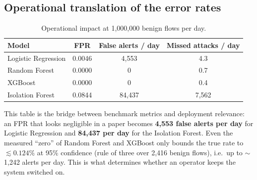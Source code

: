 \documentclass[11pt]{article}
\begin{document}
\subsection*{Operational translation of the error rates}
\begin{table}[h]
\centering
\caption{Operational impact at 1{,}000{,}000 benign flows per day.}
\label{tab:ops}
\begin{tabular}{@{} l c c c @{}}
\toprule
\textbf{Model} & \textbf{FPR} & \textbf{False alerts / day} & \textbf{Missed attacks / day} \\
\midrule
Logistic Regression & 0.0046 & 4{,}553 & 4.3 \\
Random Forest       & 0.0000 & 0 & 0.7 \\
XGBoost             & 0.0000 & 0 & 0.4 \\
Isolation Forest    & 0.0844 & 84{,}437 & 7{,}562 \\
\bottomrule
\end{tabular}
\end{table}

\noindent This table is the bridge between benchmark metrics and deployment
relevance: an FPR that looks negligible in a paper becomes \textbf{4,553
false alerts per day} for Logistic Regression and \textbf{84,437 per day} for
the Isolation Forest. Even the measured ``zero'' of Random Forest and XGBoost
only bounds the true rate to $\lesssim 0.124\%$ at 95\% confidence (rule of
three over 2,416 benign flows), i.e.\ up to $\sim$1,242 alerts per day. This is
what determines whether an operator keeps the system switched on.
\end{document}
